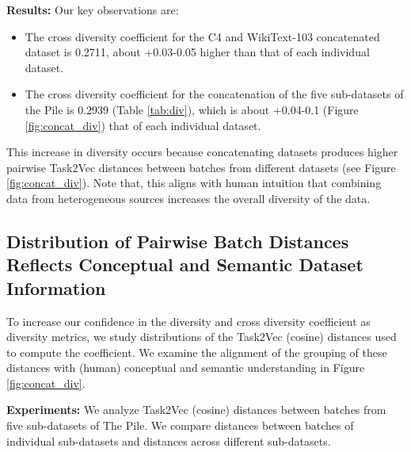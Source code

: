 \documentclass[10pt]{article} %
\begin{document}
\textbf{Results:}
Our key observations are:
\begin{itemize}
    \item The cross diversity coefficient for the C4 and WikiText-103 concatenated dataset is 0.2711, about +0.03-0.05 higher than that of each individual dataset.
    \item The cross diversity coefficient for the concatenation of the five sub-datasets of the Pile is 0.2939 (Table \ref{tab:div}), which is about +0.04-0.1 (Figure \ref{fig:concat_div}) that of each individual dataset.
\end{itemize}
This increase in diversity occurs because concatenating datasets produces higher pairwise Task2Vec distances between batches from different datasets (see Figure \ref{fig:concat_div}).
Note that, this aligns with human intuition that combining data from heterogeneous sources increases the overall diversity of the data.

\subsection{Distribution of Pairwise Batch Distances Reflects Conceptual and Semantic Dataset Information}
To increase our confidence in the diversity and cross diversity coefficient as diversity metrics, we study distributions of the Task2Vec (cosine) distances used to compute the coefficient.
We examine the alignment of the grouping of these distances with (human) conceptual and semantic understanding in Figure \ref{fig:concat_div}.

\textbf{Experiments:}
We analyze Task2Vec (cosine) distances between batches from five sub-datasets of The Pile.
We compare distances between batches of individual sub-datasets and distances across different sub-datasets.
\end{document}
